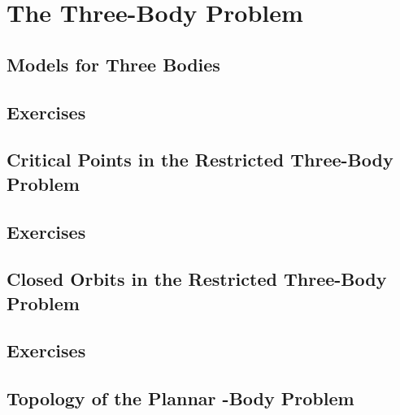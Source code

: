 \chapter{The Three-Body Problem}
\section{Models for Three Bodies}
\section*{Exercises}
\section{Critical Points in the Restricted Three-Body Problem}
\section*{Exercises}
\section{Closed Orbits in the Restricted Three-Body Problem}
\section*{Exercises}
\section{Topology of the Plannar -Body Problem}


